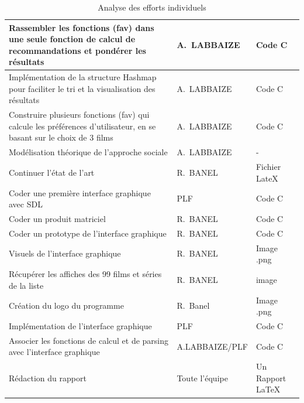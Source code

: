 \documentclass[light]{ceri}
\begin{document}
\begin{table}[H]

    \centering
    \begin{tabular}{|p{4cm}|p{4cm}|p{4cm}|}
    \hline   

       Rassembler les fonctions (fav) dans une seule fonction de calcul de recommandations et pondérer les résultats  & A.~LABBAIZE & Code C \tabularnewline \hline
       Implémentation de la structure Hashmap pour faciliter le tri et la visualisation des résultats  & A.~LABBAIZE & Code C \tabularnewline \hline

             Construire plusieurs fonctions (fav) qui calcule les préférences d'utilisateur, en se basant sur le choix de 3 films  & A.~LABBAIZE & Code C \tabularnewline \hline
         Modélisation théorique de l'approche sociale & A.~LABBAIZE & - \tabularnewline \hline
        Continuer l'état de l'art & R.~BANEL & Fichier LateX \tabularnewline \hline
        Coder une première interface graphique avec SDL & PLF & Code C \tabularnewline \hline 
        Coder un produit matriciel & R.~BANEL & Code C \tabularnewline \hline
        Coder un prototype de l'interface graphique & R.~BANEL & Code C \tabularnewline \hline 
        Visuels de l'interface graphique & R.~BANEL & Image .png \tabularnewline \hline 
        Récupérer les affiches des 99 films et séries de la liste & R.~BANEL & image \tabularnewline \hline
        Création du logo du programme  & R.~Banel & Image .png \tabularnewline \hline
        Implémentation de l'interface graphique  & PLF & Code C \tabularnewline \hline 
        Associer les fonctions de calcul et de parsing avec l'interface graphique  & A.LABBAIZE/PLF & Code C \tabularnewline \hline 
        Rédaction du rapport & Toute l'équipe &  Un Rapport LaTeX  \tabularnewline \hline
        
    \end{tabular}
    \caption{Analyse des efforts individuels}
    \label{table:efforts}
\end{table}
\end{document}
